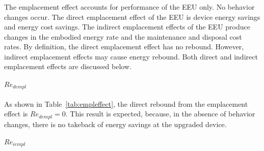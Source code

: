 % 
% 
% 	
%   
%     


\subsubsection{\Empleffect{}}
\label{sec:Re_emp}

The emplacement effect accounts for performance of the EEU only.
No behavior changes occur.
The direct emplacement effect of the EEU is device energy savings and energy cost savings.
The indirect emplacement effects of the EEU produce changes in the embodied energy rate and
the maintenance and disposal cost rates.
By definition, the direct emplacement effect has no rebound. 
However, indirect emplacement effects may cause energy rebound.
Both direct and indirect emplacement effects are discussed below.


\paragraph{$Re_{dempl}$}
\label{sec:Re_dempl}

As shown in Table~\ref{tab:empleffect},
the direct rebound from the emplacement effect is
$Re_{dempl} = 0$.
This result is expected, 
because, in the absence of behavior changes,
there is no takeback of energy savings
at the upgraded device.


\paragraph{$Re_{iempl}$} 
\label{sec:Re_iempl}

